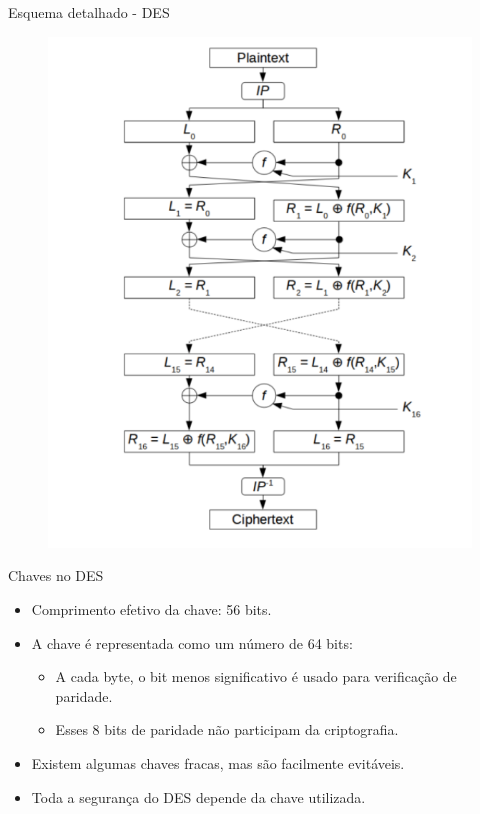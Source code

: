 \begin{frame}{Esquema detalhado - DES}
    \begin{figure}
        \centering
        \includegraphics[width=0.45\linewidth]{Figuras/DES-esquema-2.png}

    \end{figure}

\end{frame}

\begin{frame}{Chaves no DES}
    \begin{itemize}
        \item Comprimento efetivo da chave: 56 bits.
        \item A chave é representada como um número de 64 bits:
              \begin{itemize}
                  \item A cada byte, o bit menos significativo é usado para verificação de paridade.
                  \item Esses 8 bits de paridade não participam da criptografia.
              \end{itemize}
        \item Existem algumas chaves fracas, mas são facilmente evitáveis.
        \item Toda a segurança do DES depende da chave utilizada.
    \end{itemize}
\end{frame}


